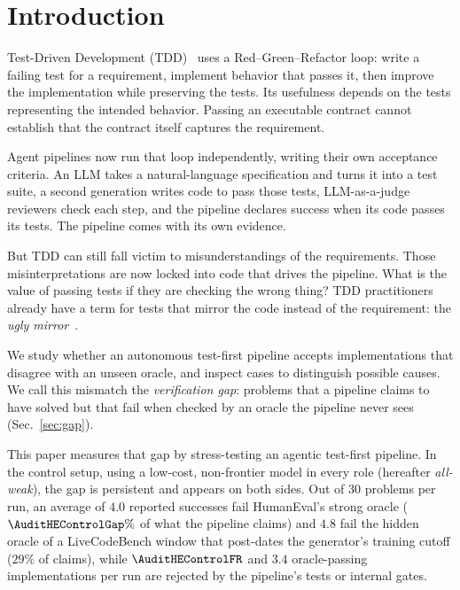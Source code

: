\section{Introduction}
\label{sec:intro}

Test-Driven Development (TDD)~\cite{beck2002tdd} uses a Red--Green--Refactor loop:
write a failing test for a requirement, implement behavior that passes it, then improve the
implementation while preserving the tests. Its usefulness depends on the tests representing
the intended behavior. Passing an executable contract cannot establish that the contract
itself captures the requirement.

Agent pipelines now run that loop independently, writing their own acceptance criteria. An LLM
takes a natural-language specification and turns it into a test suite, a second generation writes
code to pass those tests, LLM-as-a-judge reviewers check each step, and the pipeline declares
success when its code passes its tests. The pipeline comes with its own evidence.

But TDD can still fall victim to misunderstandings of the requirements. Those misinterpretations
are now locked into code that drives the pipeline. What is the value of passing tests if they are
checking the wrong thing? TDD practitioners already have a term for tests that mirror the code
instead of the requirement: the \emph{ugly mirror}~\cite{rudolph2008uglymirror}.

We study whether an autonomous test-first pipeline accepts implementations that disagree
with an unseen oracle, and inspect cases to distinguish possible causes. We call this
mismatch the \emph{verification gap}: problems that a pipeline claims to have solved but
that fail when checked by an oracle the pipeline never sees (Sec.~\ref{sec:gap}).

This paper measures that gap by stress-testing an agentic test-first pipeline. In the control
setup, using a low-cost, non-frontier model in every role (hereafter \emph{all-weak}), the gap is
persistent and appears on both sides. Out of 30 problems per run, an average of $4.0$ reported
successes fail HumanEval's strong oracle ($\AuditHEControlGap\%$ of what the pipeline claims) and $4.8$ fail the
hidden oracle of a LiveCodeBench window that post-dates the generator's training cutoff ($29\%$ of
claims), while $\AuditHEControlFR$ and $3.4$ oracle-passing implementations per run are rejected
by the pipeline's tests or internal gates.


